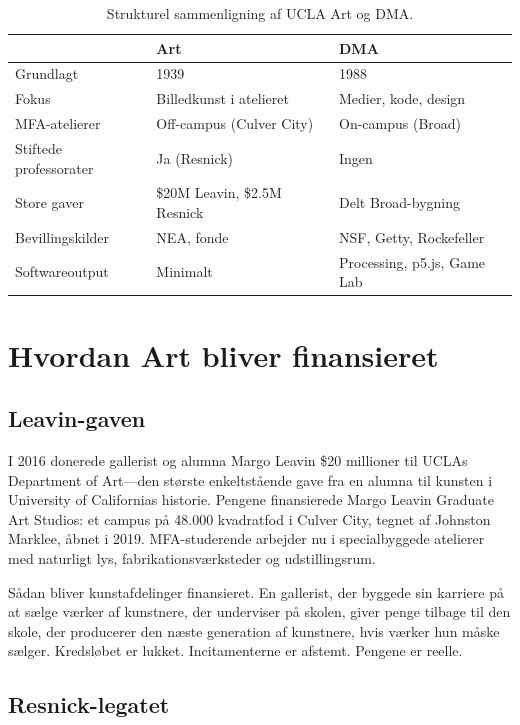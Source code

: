 \documentclass[10pt,letterpaper,twocolumn]{article}
\newcommand{\dma}{\textsc{DMA}}
\begin{document}
\begin{table}[h]
\small
\centering
\begin{tabularx}{\columnwidth}{lXX}
\toprule
& \textbf{Art} & \textbf{DMA} \\
\midrule
Grundlagt & 1939 & 1988 \\
Fokus & Billedkunst i atelieret & Medier, kode, design \\
MFA-atelierer & Off-campus (Culver City) & On-campus (Broad) \\
Stiftede professorater & Ja (Resnick) & Ingen \\
Store gaver & \$20M Leavin, \$2.5M Resnick & Delt Broad-bygning \\
Bevillingskilder & NEA, fonde & NSF, Getty, Rockefeller \\
Softwareoutput & Minimalt & Processing, p5.js, Game Lab \\
\bottomrule
\end{tabularx}
\caption{Strukturel sammenligning af UCLA Art og \dma{}.}
\label{tab:comparison}
\end{table}

\section{Hvordan Art bliver finansieret}

\subsection{Leavin-gaven}

I 2016 donerede gallerist og alumna Margo Leavin \$20 millioner til UCLAs Department of Art---den største enkeltstående gave fra en alumna til kunsten i University of Californias historie. Pengene finansierede Margo Leavin Graduate Art Studios: et campus på 48.000 kvadratfod i Culver City, tegnet af Johnston Marklee, åbnet i 2019. MFA-studerende arbejder nu i specialbyggede atelierer med naturligt lys, fabrikationsværksteder og udstillingsrum.

Sådan bliver kunstafdelinger finansieret. En gallerist, der byggede sin karriere på at sælge værker af kunstnere, der underviser på skolen, giver penge tilbage til den skole, der producerer den næste generation af kunstnere, hvis værker hun måske sælger. Kredsløbet er lukket. Incitamenterne er afstemt. Pengene er reelle.

\subsection{Resnick-legatet}
\end{document}
